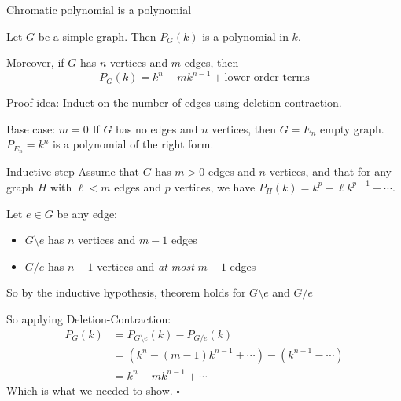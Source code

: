 \documentclass{beamer}
\begin{document}
\begin{frame}{Chromatic polynomial is a polynomial}
\begin{theorem}
Let $G$ be a simple graph. Then $P_G(k)$ is a polynomial in $k$.  

Moreover, if $G$ has $n$ vertices and $m$ edges, then 
$$P_G(k)=k^n-mk^{n-1}+\text{lower order terms}$$
\end{theorem}

\begin{block}{Proof idea:}
Induct on the number of edges using deletion-contraction.
\end{block}
\begin{block}{Base case: $m=0$}
If $G$ has no edges and $n$ vertices, then $G=E_n$ empty graph.
$P_{E_n}=k^n$ is a polynomial of the right form.
\end{block}

\end{frame}
\begin{frame}{Inductive step}
Assume that $G$ has $m>0$ edges and $n$ vertices, and that for any graph $H$ with $\ell<m$ edges and $p$ vertices, we have $P_H(k)=k^p-\ell k^{p-1}+\cdots$.

\begin{block}{Let $e\in G$ be any edge:}
\begin{itemize}
    \item $G\setminus e$ has $n$ vertices and $m-1$ edges
    \item $G/e$ has $n-1$ vertices and \emph{at most} $m-1$ edges
\end{itemize}
So by the inductive hypothesis, theorem holds for $G\setminus e$ and $G/e$
\end{block}
\begin{block}{So applying Deletion-Contraction:}\begin{align*}
    P_G(k) &= P_{G\setminus e}(k)-P_{G/e}(k) \\
    &= \left(k^n-(m-1)k^{n-1} +\cdots\right) -\left(k^{n-1}-\cdots\right) \\
    &= k^n-mk^{n-1}+\cdots
\end{align*}
Which is what we needed to show. \quad$\square$
\end{block}

\end{frame}
\end{document}
